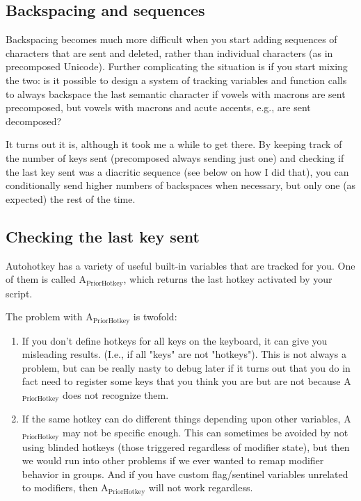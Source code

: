 \documentclass[11pt]{article}
\begin{document}
\subsection{Backspacing and sequences}
\label{sec:org290be1d}

Backspacing becomes much more difficult when you start adding sequences of characters that are sent and deleted, rather than individual characters (as in precomposed Unicode). Further complicating the situation is if you start mixing the two: is it possible to design a system of tracking variables and function calls to always backspace the last semantic character if vowels with macrons are sent precomposed, but vowels with macrons and acute accents, e.g., are sent decomposed?

It turns out it is, although it took me a while to get there. By keeping track of the number of keys sent (precomposed always sending just one) and checking if the last key sent was a diacritic sequence (see below on how I did that), you can conditionally send higher numbers of backspaces when necessary, but only one (as expected) the rest of the time.

\subsection{Checking the last key sent}
\label{sec:org16a1fcd}

Autohotkey has a variety of useful built-in variables that are tracked for you. One of them is called A\(_{\text{PriorHotkey}}\), which returns the last hotkey activated by your script.

The problem with A\(_{\text{PriorHotkey}}\) is twofold:

\begin{enumerate}
\item If you don't define hotkeys for all keys on the keyboard, it can give you misleading results. (I.e., if all "keys" are not "hotkeys"). This is not always a problem, but can be really nasty to debug later if it turns out that you do in fact need to register some keys that you think you are but are not because A\(_{\text{PriorHotkey}}\) does not recognize them.
\item If the same hotkey can do different things depending upon other variables, A\(_{\text{PriorHotkey}}\) may not be specific enough. This can sometimes be avoided by not using blinded hotkeys (those triggered regardless of modifier state), but then we would run into other problems if we ever wanted to remap modifier behavior in groups. And if you have custom flag/sentinel variables unrelated to modifiers, then A\(_{\text{PriorHotkey}}\) will not work regardless.
\end{enumerate}
\end{document}
